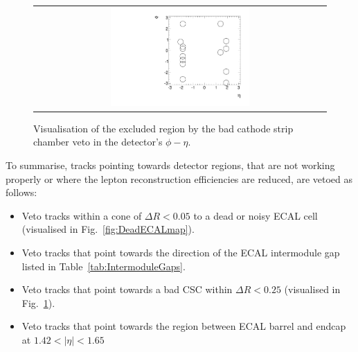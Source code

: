 \renewcommand{\arraystretch}{1.5}
\begin{table}[!b]
\centering
\caption{Intermodule ECAL gaps.}
\label{tab:IntermoduleGaps}
\end{table}  

\begin{figure}[!t]
  \centering 
  \begin{tabular}{c}
    \includegraphics[width=0.49\textwidth]{figures/analysis/AnalysisSelection/BadCSCMap2.pdf}
  \end{tabular}
  \caption{Visualisation of the excluded region by the bad cathode strip chamber veto in the detector's $\phi - \eta$.}
  \label{fig:BadCSCMap}
\end{figure}

To summarise, tracks pointing towards detector regions, that are not working properly or where the lepton reconstruction efficiencies are reduced, are vetoed as follows:
\begin{itemize}
\renewcommand{\labelitemi}{\footnotesize{\ding{118}}}
\item Veto tracks within a cone of $\Delta R<0.05$ to a dead or noisy ECAL cell (visualised in Fig.~\ref{fig:DeadECALmap}).
\item Veto tracks that point towards the direction of the ECAL intermodule gap listed in Table~\ref{tab:IntermoduleGaps}.
\item Veto tracks that point towards a bad CSC within $\Delta R<0.25$ (visualised in Fig.~\ref{fig:BadCSCMap}).
\item Veto tracks that point towards the region between ECAL barrel and endcap at $1.42<|\eta|<1.65$
\end{itemize}



